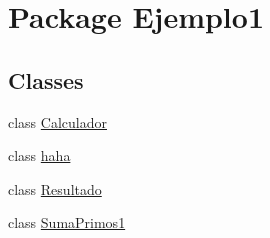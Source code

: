 \hypertarget{namespace_ejemplo1}{}\section{Package Ejemplo1}
\label{namespace_ejemplo1}
\subsection*{Classes}
\begin{DoxyCompactItemize}
\item 
class \mbox{\hyperlink{class_ejemplo1_1_1_calculador}{Calculador}}
\item 
class \mbox{\hyperlink{class_ejemplo1_1_1haha}{haha}}
\item 
class \mbox{\hyperlink{class_ejemplo1_1_1_resultado}{Resultado}}
\item 
class \mbox{\hyperlink{class_ejemplo1_1_1_suma_primos1}{Suma\+Primos1}}
\end{DoxyCompactItemize}

